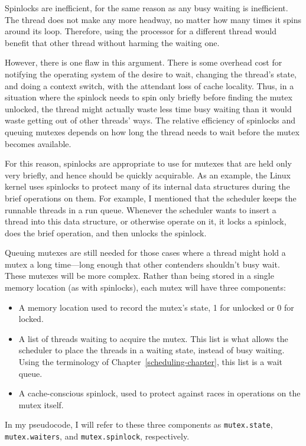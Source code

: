 Spinlocks are inefficient, for the same reason as any busy waiting is inefficient.
The thread does not make any more headway, no matter how many times it
spins around its loop.  Therefore, using the processor for a different
thread would benefit that other thread without harming the waiting
one.

However, there is one flaw in this argument.  There is some overhead
cost for notifying the operating system of the desire to wait,
changing the thread's state, and doing a context switch, with the
attendant loss of cache locality.  Thus, in a situation where the
spinlock needs to spin only briefly before finding the mutex unlocked,
the thread might actually waste less time busy waiting than it would waste
getting out of other threads' ways.  The relative efficiency of
spinlocks and queuing mutexes
depends on how long the thread needs to wait before the
mutex becomes available.

For this reason, spinlocks are appropriate to use for mutexes that are
held only very briefly, and hence should be quickly acquirable.
As an example, the Linux kernel uses spinlocks to protect many of its
internal data structures during the brief operations on them.  For
example, I mentioned that the scheduler keeps the runnable threads in
a run queue.  Whenever the scheduler wants to
insert a thread into this data structure, or otherwise operate on
it, it locks a spinlock, does the brief operation, and then
unlocks the spinlock.

Queuing mutexes are still needed for those cases where a
thread might hold a mutex a long time---long enough that other
contenders shouldn't busy wait.  These mutexes will be more complex.
Rather than being stored in a single memory location (as with
spinlocks), each mutex will have three components:
\begin{itemize}
\item
A memory location used to record the mutex's state, 1 for unlocked or
0 for locked.
\item
A list of threads waiting to acquire the mutex.  This list is what
allows the scheduler to place the threads in a waiting state, instead
of busy waiting.  Using the terminology of
Chapter~\ref{scheduling-chapter}, this list is a wait queue.
\item
A cache-conscious spinlock, used to protect against races in
operations on the mutex itself.
\end{itemize}
In my pseudocode, I will refer to these three components as
\verb|mutex.state|, \verb|mutex.waiters|, and \verb|mutex.spinlock|,
respectively.

